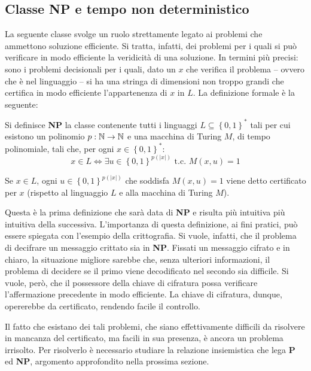 \subsection{Classe NP e tempo non deterministico}
La seguente classe svolge un ruolo strettamente legato ai problemi che ammettono soluzione efficiente.
Si tratta, infatti, dei problemi per i quali si può verificare in modo efficiente la veridicità di una soluzione.
In termini più precisi: sono i problemi decisionali per i quali, dato un $x$ che verifica il problema -- ovvero che è nel linguaggio -- si ha una stringa di dimensioni non troppo grandi che certifica in modo efficiente l'appartenenza di $x$ in $L$.
La definizione formale è la seguente:
\begin{defn}[classe NP]\label{defn:NP_det}
 Si definisce \textbf{NP} la classe contenente tutti i linguaggi $L \subseteq \left\{0,1\right\}^*$ tali per cui esistono un polinomio $p: \mathbb{N} \to \mathbb{N}$ e una macchina di Turing $M$, di tempo polinomiale, tali che, per ogni $x \in \left\{0,1\right\}^*$:
 \begin{equation}
  x \in L \iff \exists u \in \left\{0,1\right\}^{p(|x|)} \text{ t.c. } M(x,u) = 1
 \end{equation}
\end{defn}
Se $x \in L$, ogni $u \in \left\{0,1\right\}^{p(|x|)}$ che soddisfa $M(x,u)=1$ viene detto certificato per $x$ (rispetto al linguaggio $L$ e alla macchina di Turing $M$).

Questa è la prima definizione che sarà data di \textbf{NP} e risulta più intuitiva più intuitiva della successiva.
L'importanza di questa definizione, ai fini pratici, può essere spiegata con l'esempio della crittografia.
Si vuole, infatti, che il problema di decifrare un messaggio crittato sia in \textbf{NP}.
Fissati un messaggio cifrato e in chiaro, la situazione migliore sarebbe che, senza ulteriori informazioni, il problema di decidere se il primo viene decodificato nel secondo sia difficile.
Si vuole, però, che il possessore della chiave di cifratura possa verificare l'affermazione precedente in modo efficiente.
La chiave di cifratura, dunque, opererebbe da certificato, rendendo facile il controllo.

Il fatto che esistano dei tali problemi, che siano effettivamente difficili da risolvere in mancanza del certificato, ma facili in sua presenza, è ancora un problema irrisolto.
Per risolverlo è necessario studiare la relazione insiemistica che lega \textbf{P} ed \textbf{NP}, argomento approfondito nella prossima sezione.

